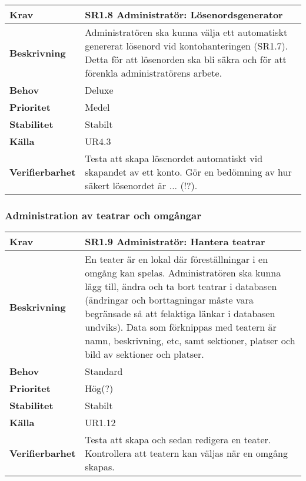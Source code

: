 \documentclass[a4paper, twoside, 11pt, titlepage]{article}
\begin{document}
		\begin{tabular} { p{2.6cm} p{12.5cm} }
			\hline
			\sffamily\textbf{Krav} & \sffamily\textbf{SR1.8 Administratör: Lösenordsgenerator } \\
			\hline
			\sffamily\textbf{Beskrivning} & Administratören ska kunna välja ett automatiskt genererat lösenord vid kontohanteringen (SR1.7). Detta för att lösenorden ska bli säkra och för att förenkla administratörens arbete.  \\
			\hline
			\sffamily\textbf{Behov} & Deluxe  \\
			\hline
			\sffamily\textbf{Prioritet} & Medel  \\
			\hline
			\sffamily\textbf{Stabilitet} & Stabilt  \\
			\hline
			\sffamily\textbf{Källa} & UR4.3  \\
			\hline
			\sffamily\textbf{Verifierbarhet} & Testa att skapa lösenordet automatiskt vid skapandet av ett konto. Gör en bedömning av hur säkert lösenordet är ... (!?).  \\
			\hline
		\end{tabular}


		\subsubsection{Administration av teatrar och omgångar}


		\begin{tabular} { p{2.6cm} p{12.5cm} }
			\hline
			\sffamily\textbf{Krav} & \sffamily\textbf{SR1.9 Administratör: Hantera teatrar } \\
			\hline
			\sffamily\textbf{Beskrivning} & En teater är en lokal där föreställningar i en omgång kan spelas. Administratören ska kunna lägg till, ändra och ta bort teatrar i databasen (ändringar och borttagningar måste vara begränsade så att felaktiga länkar i databasen undviks). Data som förknippas med teatern är namn, beskrivning, etc, samt sektioner, platser och bild av sektioner och platser.  \\
			\hline
			\sffamily\textbf{Behov} & Standard  \\
			\hline
			\sffamily\textbf{Prioritet} & Hög(?)  \\
			\hline
			\sffamily\textbf{Stabilitet} & Stabilt  \\
			\hline
			\sffamily\textbf{Källa} & UR1.12  \\
			\hline
			\sffamily\textbf{Verifierbarhet} & Testa att skapa och sedan redigera en teater. Kontrollera att teatern kan väljas när en omgång skapas.  \\
			\hline
		\end{tabular}
		\vspace{6mm}
\end{document}
